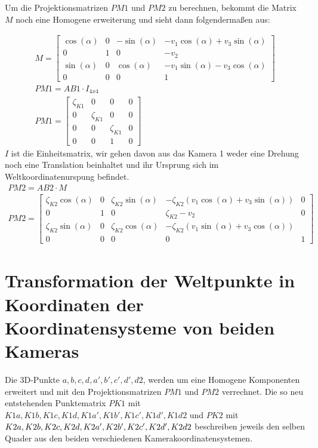 Um die Projektionsmatrizen \ensuremath{PM1} und \ensuremath{PM2} zu berechnen, bekommt die Matrix \ensuremath{M} noch eine Homogene erweiterung und sieht dann folgendermaßen aus:

\begin{gather}
M=
\begin{bmatrix}
\cos(\alpha)&0&-\sin(\alpha)&-v_1\cos(\alpha)+v_3\sin(\alpha)\\
0&1&0&-v_2\\
\sin(\alpha)&0&\cos(\alpha)&-v_1\sin(\alpha)-v_3\cos(\alpha)\\
0&0&0&1
\end{bmatrix}\\
PM1 = AB1\cdot I_{4x4} \\
PM1 =
\begin{bmatrix}
\zeta_{K1}&0&0&0\\
0&\zeta_{K1}&0&0\\
0&0&\zeta_{K1}&0\\
0&0&1&0
\end{bmatrix}
\end{gather}
\ensuremath{I} ist die Einheitsmatrix, wir gehen davon aus das Kamera 1 weder eine Drehung noch eine Translation beinhaltet und ihr Ursprung sich im Weltkoordinatenurspung befindet.\\


\begin{gather}
PM2 = AB2 \cdot M\\
PM2 =
\begin{bmatrix}
\zeta_{K2} \cos(\alpha)&0&\zeta_{K2} \sin(\alpha)&-\zeta_{K2} (v_1\cos(\alpha)+v_3\sin(\alpha) )&0\\
0&1&0&\zeta_{K2}-v_2&0\\
\zeta_{K2}\sin(\alpha)&0&\zeta_{K2}\cos(\alpha)&-\zeta_{K2}(v_1\sin(\alpha)+v_3\cos(\alpha))\\
0&0&0&0&1
\end{bmatrix}
\end{gather}

\section{Transformation der Weltpunkte in Koordinaten der Koordinatensysteme von beiden Kameras}

	Die 3D-Punkte \ensuremath{a,b,c,d,a',b',c',d',d2}, werden um eine Homogene Komponenten erweitert und mit den Projektionsmatrizen \ensuremath{PM1} und \ensuremath{PM2} verrechnet. Die so neu entstehenden Punktematrix \ensuremath{PK1} mit  \ensuremath{K1a,K1b,K1c,K1d,K1a',K1b',K1c',K1d',K1d2} und \ensuremath{PK2} mit \ensuremath{K2a,K2b,K2c,K2d,\linebreak K2a',K2b',K2c',K2d',K2d2} beschreiben jeweils den selben Quader aus den beiden verschiedenen Kamerakoordinatensystemen.\\

